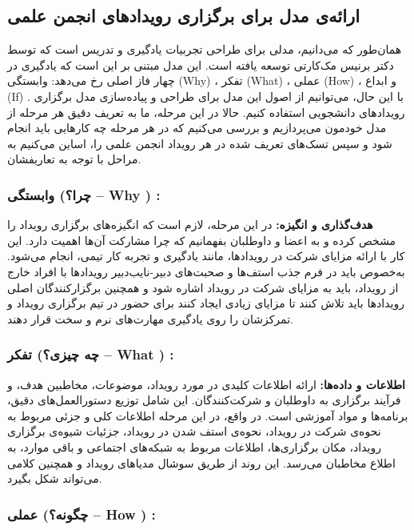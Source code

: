 \subsection*{ارائه‌ی مدل برای برگزاری رویدادهای انجمن علمی}

همان‌طور که می‌دانیم،
مدلی برای طراحی تجربیات یادگیری و تدریس است که توسط دکتر برنیس مک‌کارتی توسعه یافته است. این مدل مبتنی بر این است که یادگیری در چهار فاز اصلی رخ می‌دهد: وابستگی (Why) ، تفکر (What) ، عملی (How) ، و ابداع (If) . با این حال، می‌توانیم از اصول این مدل برای طراحی و پیاده‌سازی مدل برگزاری رویدادهای دانشجویی استفاده کنیم. حالا در این مرحله، ما به تعریف دقیق هر مرحله از مدل خودمون می‌پردازیم و بررسی می‌کنیم که در هر مرحله چه کارهایی باید انجام شود و سپس تسک‌های تعریف شده در هر رویداد انجمن علمی را، اساین می‌کنیم به مراحل با توجه به تعاریفشان.

\subsubsection*{وابستگی (چرا؟ – Why ) :}

\textbf{هدف‌گذاری و انگیزه:}
در این مرحله، لازم است که انگیزه‌های برگزاری رویداد را مشخص کرده و به اعضا و داوطلبان بفهمانیم که چرا مشارکت آن‌ها اهمیت دارد. این کار با ارائه مزایای شرکت در رویدادها، مانند یادگیری و تجربه کار تیمی، انجام می‌شود. به‌خصوص باید در فرم جذب استف‌ها و صحبت‌های دبیر-نایب‌دبیر رویدادها با افراد خارج از رویداد، باید به مزایای شرکت در رویداد اشاره شود و همچنین برگزارکنندگان اصلی رویدادها باید تلاش کنند تا مزایای زیادی ایجاد کنند برای حضور در تیم برگزاری رویداد و تمرکزشان را روی یادگیری مهارت‌های نرم و سخت قرار دهند.

\subsubsection*{تفکر (چه چیزی؟ – What ) :}

\textbf{اطلاعات و داده‌ها:}
ارائه اطلاعات کلیدی در مورد رویداد، موضوعات، مخاطبین هدف، و فرآیند برگزاری به داوطلبان و شرکت‌کنندگان. این شامل توزیع دستورالعمل‌های دقیق، برنامه‌ها و مواد آموزشی است. در واقع، در این مرحله اطلاعات کلی و جزئی مربوط به نحوه‌ی شرکت در رویداد، نحوه‌ی استف شدن در رویداد، جزئیات شیوه‌ی برگزاری رویداد، مکان برگزاری‌ها، اطلاعات مربوط به شبکه‌های اجتماعی و باقی موارد، به اطلاع مخاطبان می‌رسد. این روند از طریق سوشال مدیاهای رویداد و همچنین کلامی می‌تواند شکل بگیرد.

\subsubsection*{عملی (چگونه؟ – How ) :}

